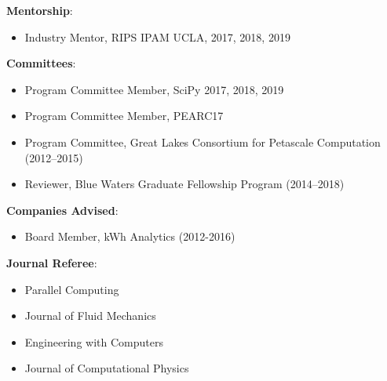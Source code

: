 
\textbf{Mentorship}:
\begin{itemize}
\itemsep 0pt
 \item Industry Mentor, RIPS IPAM UCLA, 2017, 2018, 2019
\end{itemize}

\blankline


\textbf{Committees}:
\begin{itemize}
\itemsep 0pt
 \item Program Committee Member, SciPy 2017, 2018, 2019
 \item Program Committee Member, PEARC17
 \item Program Committee, Great Lakes Consortium for Petascale Computation (2012--2015)
 \item Reviewer, Blue Waters Graduate Fellowship Program (2014--2018)
\end{itemize}
\blankline


\textbf{Companies Advised}:
\begin{itemize}
\itemsep 0pt
 \item Board Member, kWh Analytics (2012-2016)
\end{itemize}

\blankline

\textbf{Journal Referee}:
\begin{itemize}
\itemsep 0pt
 \item Parallel Computing
 \item Journal of Fluid Mechanics
 \item Engineering with Computers
 \item Journal of Computational Physics
\end{itemize}
